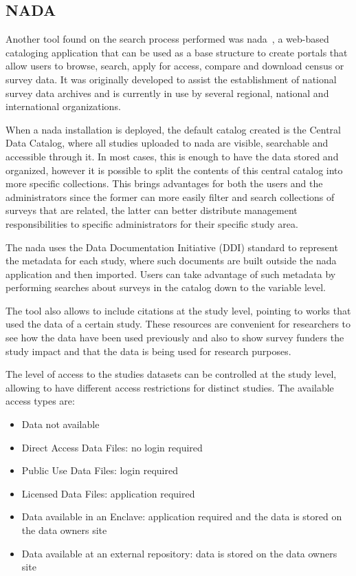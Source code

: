 \subsection*{NADA}
Another tool found on the search process performed was \gls{nada}~\cite{nada}, a web-based cataloging application that can be used as a base structure to create portals that allow users to browse, search, apply for access, compare and download census or survey data.
It was originally developed to assist the establishment of national survey data archives and is currently in use by several regional, national and international organizations.

When a \gls{nada} installation is deployed, the default catalog created is the Central Data Catalog, where all studies uploaded to \gls{nada} are visible, searchable and accessible through it.
In most cases, this is enough to have the data stored and organized, however it is possible to split the contents of this central catalog into more specific collections.
This brings advantages for both the users and the administrators since the former can more easily filter and search collections of surveys that are related, the latter can better distribute management responsibilities to specific administrators for their specific study area.

The \gls{nada} uses the Data Documentation Initiative (DDI) standard to represent the metadata for each study, where such documents are built outside the \gls{nada} application and then imported.
Users can take advantage of such metadata by performing searches about surveys in the catalog down to the variable level.

The tool also allows to include citations at the study level, pointing to works that used the data of a certain study.
These resources are convenient for researchers to see how the data have been used previously and also to show survey funders the study impact and that the data is being used for research purposes.

The level of access to the studies datasets can be controlled at the study level, allowing to have different access restrictions for distinct studies.
The available access types are:
\begin{itemize}
    \item Data not available
    \item Direct Access Data Files: no login required
    \item Public Use Data Files: login required
    \item Licensed Data Files: application required
    \item Data available in an Enclave: application required and the data is stored on the data owners site
    \item Data available at an external repository:  data is stored on the data owners site
\end{itemize}

